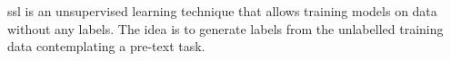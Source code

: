 \acf{ssl} is an unsupervised learning technique that allows training models on data without any labels.
The idea is to generate labels from the unlabelled training data contemplating a pre-text task.